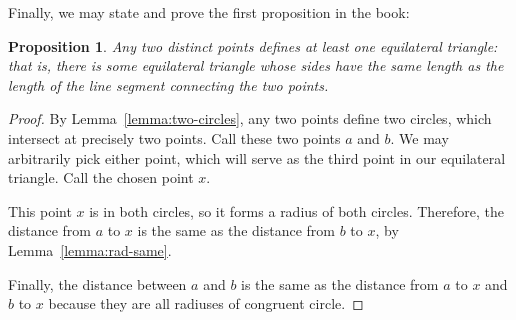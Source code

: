 \documentclass[10pt]{article}
\newtheorem{proposition}{Proposition}
\begin{document}
Finally, we may state and prove the first proposition in the book:

\begin{proposition}
    Any two distinct points defines at least one equilateral triangle: that is, there is some equilateral triangle whose sides have the same length as the length of the line segment connecting the two points.
\end{proposition}
\begin{proof}
    By Lemma~\ref{lemma:two-circles}, any two points define two circles, which intersect at precisely two points.
    Call these two points $a$ and $b$.
    We may arbitrarily pick either point, which will serve as the third point in our equilateral triangle.
    Call the chosen point $x$.

    This point $x$ is in both circles, so it forms a radius of both circles.
    Therefore, the distance from $a$ to $x$ is the same as the distance from $b$ to $x$, by Lemma~\ref{lemma:rad-same}.

    Finally, the distance between $a$ and $b$ is the same as the distance from $a$ to $x$ and $b$ to $x$ because they are all radiuses of congruent circle.
\end{proof}
\end{document}
